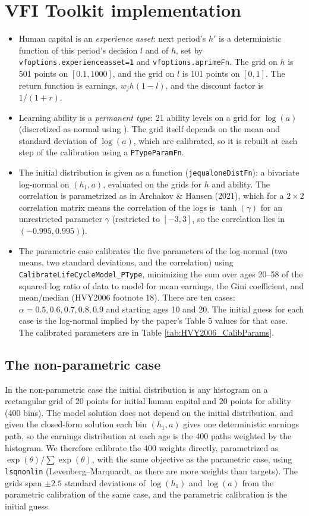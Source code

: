 \documentclass[11pt,fleqn]{article}
\begin{document}
\section{VFI Toolkit implementation}

\begin{itemize}
 \item Human capital is an \emph{experience asset}: next period's $h'$ is a deterministic function of this period's decision $l$ and of $h$, set by \verb|vfoptions.experienceasset=1| and \verb|vfoptions.aprimeFn|. The grid on $h$ is 501 points on $[0.1,1000]$, and the grid on $l$ is 101 points on $[0,1]$. The return function is earnings, $w_j h (1-l)$, and the discount factor is $1/(1+r)$.
 \item Learning ability is a \emph{permanent type}: 21 ability levels on a grid for $\log(a)$ (discretized as normal using \cite{FarmerToda2017}). The grid itself depends on the mean and standard deviation of $\log(a)$, which are calibrated, so it is rebuilt at each step of the calibration using a \verb|PTypeParamFn|.
 \item The initial distribution is given as a function (\verb|jequaloneDistFn|): a bivariate log-normal on $(h_1,a)$, evaluated on the grids for $h$ and ability. The correlation is parametrized as in Archakov \& Hansen (2021), which for a $2\times2$ correlation matrix means the correlation of the logs is $\tanh(\gamma)$ for an unrestricted parameter $\gamma$ (restricted to $[-3,3]$, so the correlation lies in $(-0.995,0.995)$).
 \item The parametric case calibrates the five parameters of the log-normal (two means, two standard deviations, and the correlation) using \verb|CalibrateLifeCycleModel_PType|, minimizing the sum over ages 20--58 of the squared log ratio of data to model for mean earnings, the Gini coefficient, and mean/median (HVY2006 footnote 18). There are ten cases: $\alpha=0.5,0.6,0.7,0.8,0.9$ and starting ages 10 and 20. The initial guess for each case is the log-normal implied by the paper's Table 5 values for that case. The calibrated parameters are in Table \ref{tab:HVY2006_CalibParams}.
\end{itemize}

\subsection{The non-parametric case}

In the non-parametric case the initial distribution is any histogram on a rectangular grid of 20 points for initial human capital and 20 points for ability (400 bins). The model solution does not depend on the initial distribution, and given the closed-form solution each bin $(h_1,a)$ gives one deterministic earnings path, so the earnings distribution at each age is the 400 paths weighted by the histogram. We therefore calibrate the 400 weights directly, parametrized as $\exp(\theta)/\sum\exp(\theta)$, with the same objective as the parametric case, using \verb|lsqnonlin| (Levenberg--Marquardt, as there are more weights than targets). The grids span $\pm2.5$ standard deviations of $\log(h_1)$ and $\log(a)$ from the parametric calibration of the same case, and the parametric calibration is the initial guess.
\end{document}
